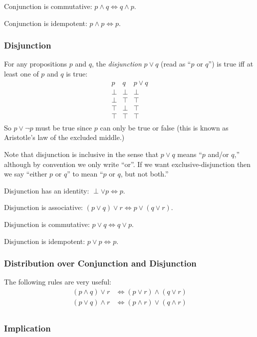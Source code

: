 \documentclass[a4paper,11pt,notitlepage,onecolumn]{article}
\newcommand{\True}%
{\top}
\newcommand{\False}%
{\perp}
\newcommand{\Not}[1]%
{\neg{}#1}
\newcommand{\Conj}%
{\wedge}
\newcommand{\Disj}%
{\vee}
\newcommand{\Eqv}%
{\Leftrightarrow}
\begin{document}
Conjunction is commutative: $p \Conj q \Eqv q \Conj p$.

Conjunction is idempotent: $p \Conj p \Eqv p$.

\subsubsection{Disjunction}

For any propositions $p$ and $q$, the \emph{disjunction} $p \Disj q$
(read as ``$p$ or $q$'') is true iff at least one of $p$ and $q$ is
true:
\[
\begin{array}{cc|c}
p       & q       & p \Disj q \\
\hline
\False  & \False  & \False \\
\False  & \True   & \True \\
\True   & \False  & \True \\
\True   & \True   & \True \\
\end{array}
\]
So $p \Disj \Not{p}$ must be true since $p$ can only be true or false
(this is known as Aristotle's law of the excluded middle.)

Note that disjunction is inclusive in the sense that $p \Disj q$ means
``$p$ and/or $q$,'' although by convention we only write ``or''.  If we
want exclusive-disjunction then we say ``either $p$ or $q$'' to mean
``$p$ or $q$, but not both.''

Disjunction has an identity: $\False \Disj p \Eqv p$.

Disjunction is associative: $(p \Disj q) \Disj r \Eqv p \Disj (q \Disj r)$.

Disjunction is commutative: $p \Disj q \Eqv q \Disj p$.

Disjunction is idempotent: $p \Disj p \Eqv p$.

\subsubsection{Distribution over Conjunction and Disjunction}

The following rules are very useful:
\begin{align*}
(p \Conj q) \Disj r
& \Eqv (p \Disj r) \Conj (q \Disj r) \\
(p \Disj q) \Conj r
& \Eqv (p \Conj r) \Disj (q \Conj r) \\
\end{align*}

\subsubsection{Implication}
\end{document}
